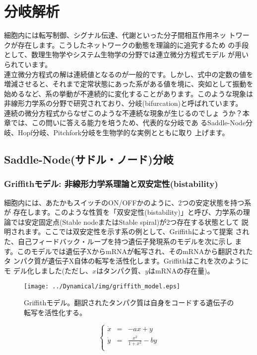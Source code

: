\chapter{分岐解析}
\indent 細胞内には転写制御、シグナル伝達、代謝といった分子間相互作用ネッ
トワークが存在します。こうしたネットワークの動態を理論的に追究するため
の手段として、数理生物学やシステム生物学の分野では連立微分方程式モデル
が用いられています。\\
\indent 連立微分方程式の解は連続値となるのが一般的です。しかし、式中の定数の値を増減させると、それまで定常状態にあった系がある値を境に、突如として振動を始めるなど、系の挙動が不連続的に変化することがあります。このような現象は非線形力学系の分野で研究されており、分岐(bifurcation)と呼ばれています。\\
\indent 連続の微分方程式からなぜこのような不連続な現象が生じるのでしょ
うか？本章では、この問いに答える能力を培うため、代表的な分岐であ
るSaddle-Node分岐、Hopf分岐、Pitchfork分岐を生物学的な実例とともに取り
上げます。

\section{Saddle-Node(サドル・ノード)分岐}
\subsection{Griffithモデル: 非線形力学系理論と双安定性(bistability)}
細胞内には、あたかもスイッチのON/OFFかのように、2つの安定状態を持つ系が
存在します。このような性質を「双安定性(bistability)」と呼び、力学系の理
論では安定固定点(Stable nodeまたはStable spiral)が2つ存在する状態として
説明されます。ここでは双安定性を示す系の例として、Griffithによって提案
された、自己フィードバック・ループを持つ遺伝子発現系のモデルを次に示し
ます。このモデルでは遺伝子XからmRNAが転写され、そのmRNAから翻訳されたタ
ンパク質が遺伝子X自体の転写を活性化します。Griffithはこれを次のようにモ
デル化しました(ただし、\(x\)はタンパク質、\(y\)はmRNAの存在量)。

\begin{figure}[ht]
        \centering \texttt{[image: ../Dynamical/img/griffith\_model.eps]}
        \caption{Griffithモデル。翻訳されたタンパク質は自身をコードする遺伝子の転写を活性化する。}
        \label{fig:04sysbio} \end{figure}

\[
\left\{
\begin{array}{lclclll}
\dot x & = & -ax + y\\
\dot y & = & \displaystyle\frac{x^2}{1+x^2} - by\\
\end{array}
\right.\]

